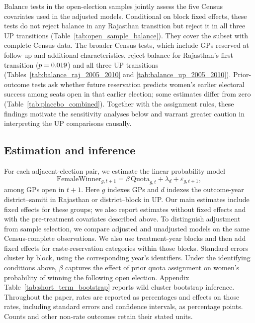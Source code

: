 \documentclass[11pt]{article}
\begin{document}
Balance tests in the open-election samples jointly assess the five Census covariates used in the adjusted models. Conditional on block fixed effects, these tests do not reject balance in any Rajasthan transition but reject it in all three UP transitions (Table~\ref{tab:open_sample_balance}). They cover the subset with complete Census data. The broader Census tests, which include GPs reserved at follow-up and additional characteristics, reject balance for Rajasthan's first transition ($p=0.019{}$) and all three UP transitions (Tables~\ref{tab:balance_raj_2005_2010} and \ref{tab:balance_up_2005_2010}). Prior-outcome tests ask whether future reservation predicts women's earlier electoral success among seats open in that earlier election; some estimates differ from zero (Table~\ref{tab:placebo_combined}). Together with the assignment rules, these findings motivate the sensitivity analyses below and warrant greater caution in interpreting the UP comparisons causally.

\subsection{Estimation and inference}\label{sec:estimation}

For each adjacent-election pair, we estimate the linear probability model
\begin{equation}\label{eq:estimation_eqn}
\text{FemaleWinner}_{g,t+1} = \beta\,\text{Quota}_{g,t} + \lambda_d + \varepsilon_{g,t+1},
\end{equation}
\noindent among GPs open in $t+1$. Here $g$ indexes GPs and $d$ indexes the outcome-year district--samiti in Rajasthan or district--block in UP. Our main estimates include fixed effects for these groups; we also report estimates without fixed effects and with the pre-treatment covariates described above. To distinguish adjustment from sample selection, we compare adjusted and unadjusted models on the same Census-complete observations. We also use treatment-year blocks and then add fixed effects for caste-reservation categories within those blocks. Standard errors cluster by block, using the corresponding year's identifiers. Under the identifying conditions above, $\beta$ captures the effect of prior quota assignment on women's probability of winning the following open election. Appendix Table~\ref{tab:short_term_bootstrap} reports wild cluster bootstrap inference. Throughout the paper, rates are reported as percentages and effects on those rates, including standard errors and confidence intervals, as percentage points. Counts and other non-rate outcomes retain their stated units.
\end{document}
